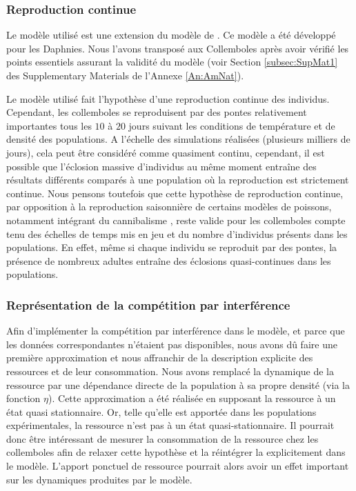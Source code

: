 \subsubsection{Reproduction continue}

Le modèle utilisé est une extension du modèle de \textcites{kooijman1984a}. Ce
modèle a été développé pour les Daphnies. Nous l'avons transposé aux Collemboles
après avoir vérifié les points essentiels assurant la validité du modèle (voir
Section \ref{subsec:SupMat1} des Supplementary Materials de l'Annexe
\ref{An:AmNat}).

Le modèle utilisé fait l'hypothèse d'une reproduction continue des individus.
Cependant, les collemboles se reproduisent par des pontes relativement
importantes tous les $10$ à $20$ jours suivant les conditions de température et
de densité des populations. A l'échelle des simulations réalisées (plusieurs
milliers de jours), cela peut être considéré comme quasiment continu,
cependant, il est possible que l'éclosion massive d'individus au même moment
entraîne des résultats différents comparés à une population où la reproduction
est strictement continue. Nous pensons toutefois que cette hypothèse de reproduction
continue, par opposition à la reproduction saisonnière de certains modèles de
poissons, notamment intégrant du cannibalisme
\autocites{claessen2000a,claessen2004a}, reste valide pour les collemboles
compte tenu des échelles de temps mis en jeu et du nombre d'individus présents
dans les populations. En effet, même si chaque individu se reproduit par des
pontes, la présence de nombreux adultes entraîne des éclosions quasi-continues
dans les populations.

\subsubsection{Représentation de la compétition par interférence}

Afin d'implémenter la compétition par interférence dans le modèle, et parce que
les données correspondantes n'étaient pas disponibles, nous avons dû faire une
première approximation et nous affranchir de la description explicite des
ressources et de leur consommation. Nous avons remplacé la dynamique de la
ressource par une dépendance directe de la population à sa propre densité (via
la fonction $\eta$). Cette approximation a été réalisée en supposant la
ressource à un état quasi stationnaire. Or, telle qu'elle est apportée dans les
populations expérimentales, la ressource n'est pas à un état quasi-stationnaire.
Il pourrait donc être intéressant de mesurer la consommation de la ressource
chez les collemboles afin de relaxer cette hypothèse et la réintégrer la
explicitement dans le modèle. L'apport ponctuel de ressource pourrait alors
 avoir un effet important sur les dynamiques produites par le modèle.

